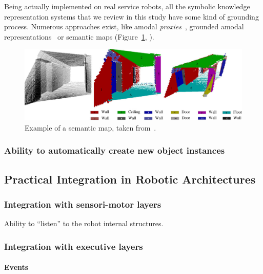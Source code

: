 \documentclass[a4paper, twocolumn]{article}
\begin{document}
Being actually implemented on real service robots, all the symbolic knowledge
representation systems that we review in this study have some kind of grounding
process. Numerous approaches exist, like amodal
\emph{proxies}~\cite{Jacobsson2008}, grounded amodal
representations~\cite{Alami2011, Mavridis2006} or semantic maps
(Figure~\ref{fig|semanticmap}, \cite{Nuechter2008, Galindo2008,Blodow2011}).

\begin{figure}
    \centering
    \includegraphics[width=0.9\columnwidth]{semanticmaps_hertzberg.png}
    \caption{Example of a semantic map, taken from~\cite{Nuechter2008}.}
    \label{fig|semanticmap}
\end{figure}

\subsubsection{Ability to automatically create new object instances}
\label{sect|new-instances}

\subsection{Practical Integration in Robotic Architectures}
\label{sect|integration-robot}

\subsubsection{Integration with sensori-motor layers}
\label{sect|integration-sensorimotor}

Ability to ``listen'' to the robot internal structures.

\subsubsection{Integration with executive layers}
\label{sect|integration-executive-layers}

\paragraph{Events}
\end{document}
